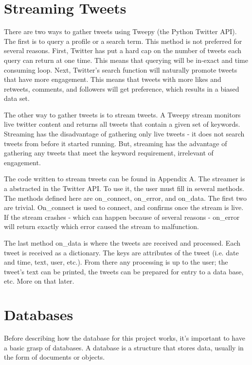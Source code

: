 \documentclass[11pt, twoside, reqno]{book}
\begin{document}
\section{Streaming Tweets}
\hspace{0.1in} There are two ways to gather tweets using Tweepy (the Python Twitter API). The first is to query a profile or a search term. This method is not preferred for several reasons. First, Twitter has put a hard cap on the number of tweets each query can return at one time. This means that querying will be in-exact and time consuming loop. Next, Twitter's search function will naturally promote tweets that have more engagement. This means that tweets with more likes and retweets, comments, and followers will get preference, which results in a biased data set. 

The other way to gather tweets is to stream tweets. A Tweepy stream monitors live twitter content and returns all tweets that contain a given set of keywords. Streaming has the disadvantage of gathering only live tweets - it does not search tweets from before it started running. But, streaming has the advantage of gathering any tweets that meet the keyword requirement, irrelevant of engagement. 

The code written to stream tweets can be found in Appendix A. The streamer is a abstracted in the Twitter API. To use it, the user must fill in several methods. The methods defined here are on\_connect, on\_error, and on\_data. The first two are trivial. On\_connect is used to connect, and confirms once the stream is live. If the stream crashes - which can happen because of several reasons - on\_error will return exactly which error caused the stream to malfunction. 

The last method on\_data is where the tweets are received and processed. Each tweet is received as a dictionary. The keys are attributes of the tweet (i.e. date and time, text, user, etc.). From there any processing is up to the user; the tweet's text can be printed, the tweets can be prepared for entry to a data base, etc. More on that later. 

\section{Databases}
\hspace{0.1in} Before describing how the database for this project works, it's important to have a basic grasp of databases. A database is a structure that stores data, usually in the form of documents or objects. 
\end{document}
